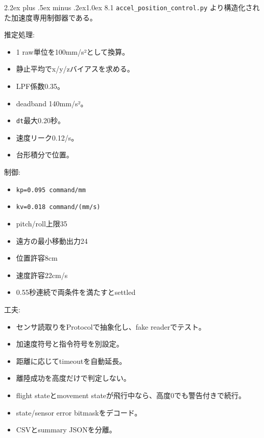 \documentclass[10pt,a4paper,openany]{ltjsbook}
\makeatletter
\renewcommand\section{\@startsection{section}{1}{0pt}%
  {2.2ex plus .5ex minus .2ex}{1.0ex}%
  {\sffamily\Large\bfseries\color{ReportNavy}}}
\makeatother
\begin{document}
\section{8.1 \texttt{accel\_position\_control.py}}
より構造化された加速度専用制御器である。\par
推定処理:\par
\begin{itemize}
\item 1 raw単位を100mm/s²として換算。
\item 静止平均でx/y/zバイアスを求める。
\item LPF係数0.35。
\item deadband 140mm/s²。
\item \texttt{dt}最大0.20秒。
\item 速度リーク0.12/s。
\item 台形積分で位置。
\end{itemize}
制御:\par
\begin{itemize}
\item \texttt{kp=0.095 command/mm}
\item \texttt{kv=0.018 command/(mm/s)}
\item pitch/roll上限35
\item 遠方の最小移動出力24
\item 位置許容8cm
\item 速度許容22cm/s
\item 0.55秒連続で両条件を満たすとsettled
\end{itemize}
工夫:\par
\begin{itemize}
\item センサ読取りをProtocolで抽象化し、fake readerでテスト。
\item 加速度符号と指令符号を別設定。
\item 距離に応じてtimeoutを自動延長。
\item 離陸成功を高度だけで判定しない。
\item flight stateとmovement stateが飛行中なら、高度0でも警告付きで続行。
\item state/sensor error bitmaskをデコード。
\item CSVとsummary JSONを分離。
\end{itemize}
\end{document}

